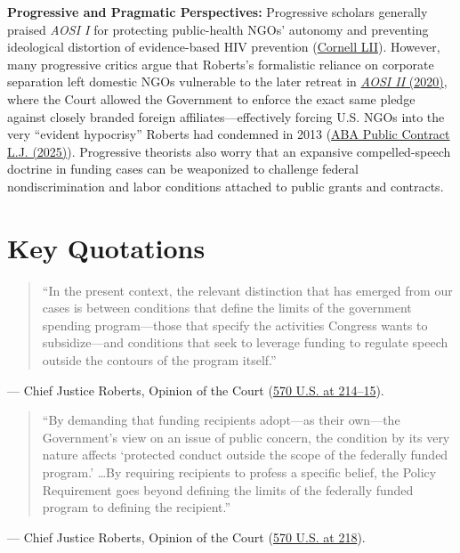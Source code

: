 \documentclass[12pt]{article}
\begin{document}
\textbf{Progressive and Pragmatic Perspectives:} Progressive scholars generally praised \textit{AOSI I} for protecting public-health NGOs' autonomy and preventing ideological distortion of evidence-based HIV prevention (\href{https://www.law.cornell.edu/supct/cert/12-10}{Cornell LII}). However, many progressive critics argue that Roberts's formalistic reliance on corporate separation left domestic NGOs vulnerable to the later retreat in \href{https://supreme.justia.com/cases/federal/us/591/19-177/}{\textit{AOSI II} (2020)}, where the Court allowed the Government to enforce the exact same pledge against closely branded foreign affiliates---effectively forcing U.S. NGOs into the very ``evident hypocrisy'' Roberts had condemned in 2013 (\href{https://www.americanbar.org/groups/public_contract_law/resources/journal/2025-spring/preserving-government-contractor-speech-rights-overlooked-implications/}{ABA Public Contract L.J. (2025)}). Progressive theorists also worry that an expansive compelled-speech doctrine in funding cases can be weaponized to challenge federal nondiscrimination and labor conditions attached to public grants and contracts.

\section{Key Quotations}
\begin{quote}
``In the present context, the relevant distinction that has emerged from our cases is between conditions that define the limits of the government spending program---those that specify the activities Congress wants to subsidize---and conditions that seek to leverage funding to regulate speech outside the contours of the program itself.''
\end{quote}
\noindent --- Chief Justice Roberts, Opinion of the Court (\href{https://supreme.justia.com/cases/federal/us/570/205/}{570 U.S. at 214--15}).

\begin{quote}
``By demanding that funding recipients adopt---as their own---the Government's view on an issue of public concern, the condition by its very nature affects `protected conduct outside the scope of the federally funded program.' \ldots By requiring recipients to profess a specific belief, the Policy Requirement goes beyond defining the limits of the federally funded program to defining the recipient.''
\end{quote}
\noindent --- Chief Justice Roberts, Opinion of the Court (\href{https://supreme.justia.com/cases/federal/us/570/205/}{570 U.S. at 218}).
\end{document}
